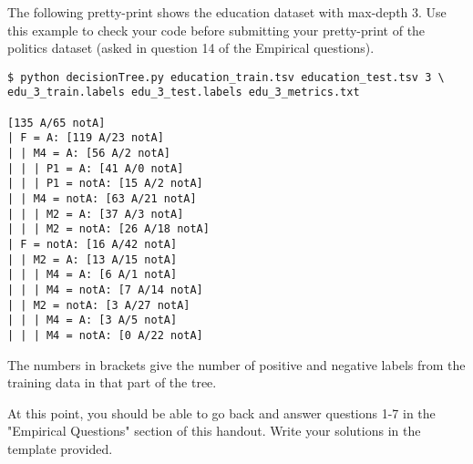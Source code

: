 \documentclass[11pt,addpoints,answers]{exam}
\begin{document}
The following pretty-print shows the education dataset with max-depth 3.  Use this example to check your code before submitting your pretty-print of the politics dataset (asked in question 14 of the Empirical questions).  

\begin{lstlisting}[language=Shell]
$ python decisionTree.py education_train.tsv education_test.tsv 3 \
edu_3_train.labels edu_3_test.labels edu_3_metrics.txt

[135 A/65 notA]
| F = A: [119 A/23 notA]
| | M4 = A: [56 A/2 notA]
| | | P1 = A: [41 A/0 notA]
| | | P1 = notA: [15 A/2 notA]
| | M4 = notA: [63 A/21 notA]
| | | M2 = A: [37 A/3 notA]
| | | M2 = notA: [26 A/18 notA]
| F = notA: [16 A/42 notA]
| | M2 = A: [13 A/15 notA]
| | | M4 = A: [6 A/1 notA]
| | | M4 = notA: [7 A/14 notA]
| | M2 = notA: [3 A/27 notA]
| | | M4 = A: [3 A/5 notA]
| | | M4 = notA: [0 A/22 notA]
\end{lstlisting}

The numbers in brackets give the number of positive and negative labels from the training data in that part of the tree.

\begin{notebox}
At this point, you should be able to go back and answer questions 1-7 in the "Empirical Questions" section of this handout.  Write your solutions in the template provided. 
\end{notebox}
\end{document}
